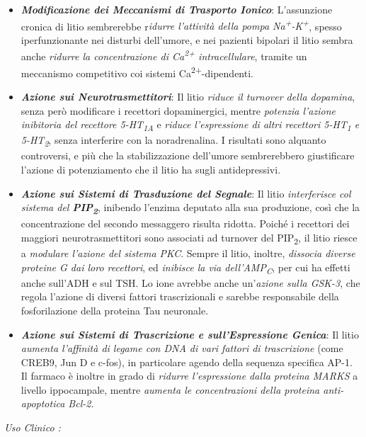 \begin{itemize}
\begin{itemize}
\item
  \textbf{\emph{Modificazione dei Meccanismi di Trasporto Ionico}}:
  L'assunzione cronica di litio sembrerebbe r\emph{idurre l'attività
  della pompa Na\textsuperscript{+}-K\textsuperscript{+}}, spesso
  iperfunzionante nei disturbi dell'umore, e nei pazienti bipolari il
  litio sembra anche \emph{ridurre la concentrazione di
  Ca\textsuperscript{2+} intracellulare}, tramite un meccanismo
  competitivo coi sistemi Ca\textsuperscript{2+}-dipendenti.
\item
  \textbf{\emph{Azione sui Neurotrasmettitori}}: Il litio \emph{riduce
  il turnover della dopamina}, senza però modificare i recettori
  dopaminergici, mentre \emph{potenzia l'azione inibitoria del recettore
  5-HT\textsubscript{1A}} e \emph{riduce l'espressione di altri
  recettori 5-HT\textsubscript{1} e 5-HT\textsubscript{2}}, senza
  interferire con la noradrenalina. I risultati sono alquanto
  controversi, e più che la stabilizzazione dell'umore sembrerebbero
  giustificare l'azione di potenziamento che il litio ha sugli
  antidepressivi.
\item
  \textbf{\emph{Azione sui Sistemi di Trasduzione del Segnale}}: Il
  litio \emph{interferisce col sistema del
  \textbf{PIP\textsubscript{2}}}, inibendo l'enzima deputato alla sua
  produzione, così che la concentrazione del secondo messaggero risulta
  ridotta. Poiché i recettori dei maggiori neurotrasmettitori sono
  associati ad turnover del PIP\textsubscript{2}, il litio riesce a
  \emph{modulare l'azione del sistema PKC}. Sempre il litio, inoltre,
  \emph{dissocia diverse proteine G dai loro recettori}, ed
  \emph{inibisce la via dell'AMP\textsubscript{C}}, per cui ha effetti
  anche sull'ADH e sul TSH. Lo ione avrebbe anche un'\emph{azione sulla
  GSK-3}, che regola l'azione di diversi fattori trascrizionali e
  sarebbe responsabile della fosforilazione della proteina Tau
  neuronale.
\item
  \textbf{\emph{Azione sui Sistemi di Trascrizione e sull'Espressione
  Genica}}: Il litio \emph{aumenta l'affinità di legame con DNA di vari
  fattori di trascrizione} (come CREB9, Jun D e c-fos), in particolare
  agendo della sequenza specifica AP-1. Il farmaco è inoltre in grado di
  \emph{ridurre l'espressione dalla proteina MARKS} a livello
  ippocampale, mentre \emph{aumenta le concentrazioni della proteina
  anti-apoptotica Bcl-2}.
\end{itemize}

\emph{\emph{Uso Clinico :}}


\end{itemize}
